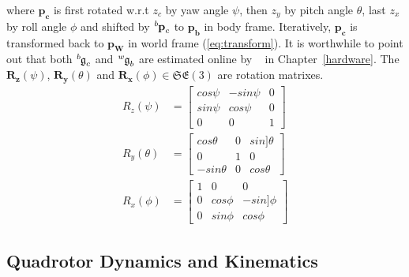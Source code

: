 where $\mathbf{p_c}$ is first rotated w.r.t $z_c$ by yaw angle $\psi$, then $z_y$ by pitch angle $\theta$, last $z_x$ by roll angle $\phi$ and shifted by $\tensor*[^b]{\mathbf{p}}{_c}$ to $\mathbf{p_b}$ in body frame. Iteratively, $\mathbf{p_c}$ is transformed back to $\mathbf{p_W}$ in world frame (\ref{eq:transform}). It is worthwhile to point out that both $\tensor*[^b]{\mathfrak{g}}{_c}$ and $\tensor*[^w]{\mathfrak{g}}{_b}$ are estimated online by ~\cite{VINS} in Chapter~\ref{hardware}. The $\mathbf{R_z}(\psi)$, $\mathbf{R_y}(\theta)$ and $\mathbf{R_x}(\phi)\in\mathfrak{SE(3)}$ are rotation matrixes.
\begin{equation}\label{eq:rotation}
\begin{aligned}
R_z(\psi)&=\begin{bmatrix}cos\psi&-sin\psi&0\\sin\psi&cos\psi&0\\0&0&1\end{bmatrix}\\
R_y(\theta)&=\begin{bmatrix}cos\theta&0&sin]\theta\\0&1&0\\-sin\theta&0&cos\theta\end{bmatrix}\\
R_x(\phi)&=\begin{bmatrix}1&0&0\\0&cos\phi&-sin]\phi\\0&sin\phi&cos\phi\end{bmatrix}
\end{aligned}
\end{equation}

\subsection{Quadrotor Dynamics and Kinematics}

